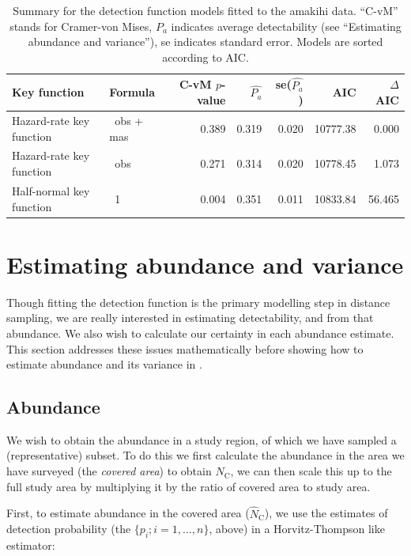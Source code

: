 \documentclass[article]{jss}
\begin{document}
\begin{table}

\caption{Summary for the detection function models fitted to the amakihi data. ``C-vM'' stands for Cramer-von Mises, $P_a$ indicates average detectability (see ``Estimating abundance and variance''), se indicates standard error. Models are sorted according to AIC.\label{tab:amakihi}}
\begin{tabular}{llrrrrr}
\toprule
Key function & Formula & C-vM $p$-value & $\hat{P_a}$ & se($\hat{P_a}$) & AIC & $\Delta$AIC\\
\midrule
Hazard-rate key function & ~obs + mas & 0.389 & 0.319 & 0.020 & 10777.38 & 0.000\\
Hazard-rate key function & ~obs & 0.271 & 0.314 & 0.020 & 10778.45 & 1.073\\
Half-normal key function & ~1 & 0.004 & 0.351 & 0.011 & 10833.84 & 56.465\\
\bottomrule
\end{tabular}
\end{table}

\section{Estimating abundance and
variance}\label{estimating-abundance-and-variance}

Though fitting the detection function is the primary modelling step in
distance sampling, we are really interested in estimating detectability,
and from that abundance. We also wish to calculate our certainty in each
abundance estimate. This section addresses these issues mathematically
before showing how to estimate abundance and its variance in
.

\subsection{Abundance}\label{abundance}

We wish to obtain the abundance in a study region, of which we have
sampled a (representative) subset. To do this we first calculate the
abundance in the area we have surveyed (the \emph{covered area}) to
obtain \(\hat{N}_\text{C}\), we can then scale this up to the full study
area by multiplying it by the ratio of covered area to study area.

First, to estimate abundance in the covered area (\(\hat{N}_\text{C}\)),
we use the estimates of detection probability (the
\(\{p_i; i=1,\ldots,n\}\), above) in a Horvitz-Thompson like estimator:
\end{document}
